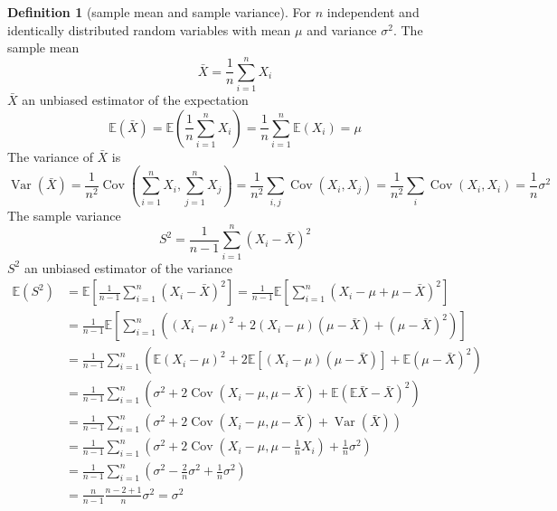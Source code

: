 \documentclass{article}
\theoremstyle{definition}
\newtheorem{definition}[theorem]{Definition}
\theoremstyle{remark}
\newcommand{\E}{\mathbb{E}}
\newcommand{\Var}{\operatorname{Var}}
\newcommand{\Cov}{\operatorname{Cov}}
\begin{document}
\begin{definition}[sample mean and sample variance]
	For \(n\) independent and identically distributed random variables with mean \(\mu\) and variance \(\sigma^2\).
	The sample mean
	\[
		\bar{X}=\frac{1}{n}\sum_{i=1}^n X_i
	\]
	\(\bar{X}\) an unbiased estimator of the expectation
	\[
		\E(\bar{X}) = \E\left(\frac{1}{n}\sum_{i=1}^n X_i\right) = \frac{1}{n}\sum_{i=1}^n\E(X_i) = \mu
	\]
	The variance of \(\bar{X}\) is
	\[
		\Var(\bar{X}) = \frac{1}{n^2}\Cov\left(\sum_{i=1}^n X_i,\sum_{j=1}^n X_j\right)
		= \frac{1}{n^2}\sum_{i,j} \Cov(X_i,X_j)
		= \frac{1}{n^2}\sum_{i} \Cov(X_i,X_i)
		= \frac{1}{n}\sigma^2
	\]
	The sample variance
	\[
		S^2 = \frac{1}{n-1}\sum_{i=1}^n {(X_i - \bar{X})}^2
	\]
	\(S^2\) an unbiased estimator of the variance
	\begin{align*}
		\E(S^2)
		 & = \E\left[ \frac{1}{n-1}\sum_{i=1}^n {(X_i - \bar{X})}^2 \right]
		= \frac{1}{n-1} \E\left[ \sum_{i=1}^n {(X_i - \mu + \mu - \bar{X})}^2 \right] \\
		 & = \frac{1}{n-1} \E\left[
		\sum_{i=1}^n \left(
		{(X_i-\mu)}^2 + 2(X_i-\mu)(\mu-\bar{X}) + {(\mu-\bar{X})}^2
		\right)
		\right]                                                                       \\
		 & = \frac{1}{n-1} \sum_{i=1}^n \left(
		\E{(X_i-\mu)}^2 + 2\E\left[(X_i-\mu)(\mu-\bar{X})\right] + \E{(\mu-\bar{X})}^2
		\right)                                                                       \\
		 & = \frac{1}{n-1} \sum_{i=1}^n \left(
		\sigma^2 + 2\Cov(X_i-\mu,\mu-\bar{X}) + \E{(\E\bar{X}-\bar{X})}^2
		\right)                                                                       \\
		 & = \frac{1}{n-1} \sum_{i=1}^n \left(
		\sigma^2 + 2\Cov(X_i-\mu,\mu-\bar{X}) + \Var(\bar{X})
		\right)                                                                       \\
		 & = \frac{1}{n-1} \sum_{i=1}^n \left(
		\sigma^2 + 2\Cov\left(X_i-\mu,\mu-\frac{1}{n}X_i\right) + \frac{1}{n}\sigma^2
		\right)                                                                       \\
		 & = \frac{1}{n-1} \sum_{i=1}^n \left(
		\sigma^2 - \frac{2}{n}\sigma^2 + \frac{1}{n}\sigma^2
		\right)                                                                       \\
		 & = \frac{n}{n-1} \frac{n-2+1}{n} \sigma^2 = \sigma^2
	\end{align*}
\end{definition}
\end{document}
